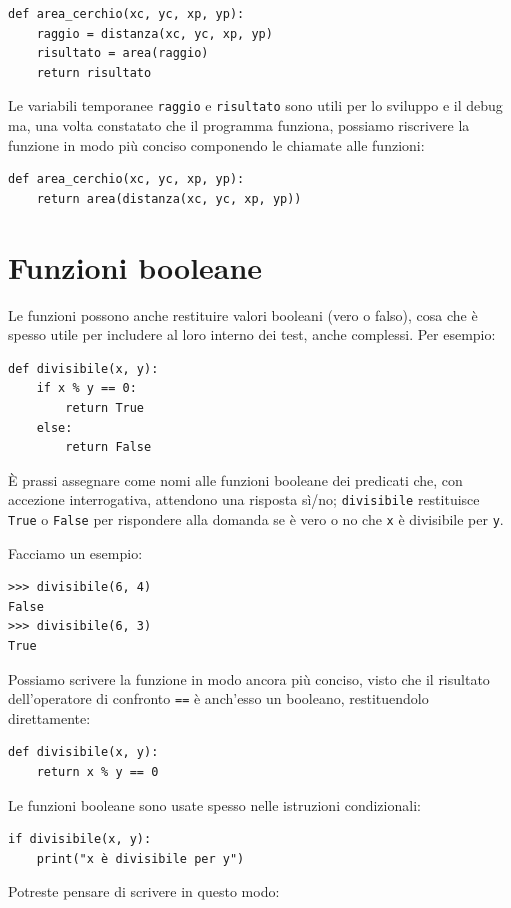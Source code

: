 \documentclass[10pt]{book}
\begin{document}
\begin{verbatim}
def area_cerchio(xc, yc, xp, yp):
    raggio = distanza(xc, yc, xp, yp)
    risultato = area(raggio)
    return risultato
\end{verbatim}
%
Le variabili temporanee {\tt raggio} e {\tt risultato} sono utili per lo sviluppo
e il debug ma, una volta constatato che il programma funziona, possiamo riscrivere la funzione in modo più conciso componendo le chiamate alle funzioni:

\begin{verbatim}
def area_cerchio(xc, yc, xp, yp):
    return area(distanza(xc, yc, xp, yp))
\end{verbatim}
%

\section{Funzioni booleane}
\label{boolean}

Le funzioni possono anche restituire valori booleani (vero o falso), cosa che è spesso utile per includere al loro interno dei test, anche complessi.  
Per esempio:

\begin{verbatim}
def divisibile(x, y):
    if x % y == 0:
        return True
    else:
        return False
\end{verbatim}
%
È prassi assegnare come nomi alle funzioni booleane dei predicati che, con accezione interrogativa, attendono una risposta sì/no; \verb"divisibile" restituisce {\tt True} o {\tt False} per rispondere alla domanda se è vero o no che {\tt x} è divisibile per {\tt y}.

Facciamo un esempio:

\begin{verbatim}
>>> divisibile(6, 4)
False
>>> divisibile(6, 3)
True
\end{verbatim}
%
Possiamo scrivere la funzione in modo ancora più conciso, visto che il risultato dell'operatore di confronto {\tt ==} è anch'esso un booleano, restituendolo direttamente:

\begin{verbatim}
def divisibile(x, y):
    return x % y == 0
\end{verbatim}
%
Le funzioni booleane sono usate spesso nelle istruzioni condizionali:

\begin{verbatim}
if divisibile(x, y):
    print("x è divisibile per y")
\end{verbatim}
%
Potreste pensare di scrivere in questo modo:
\end{document}
